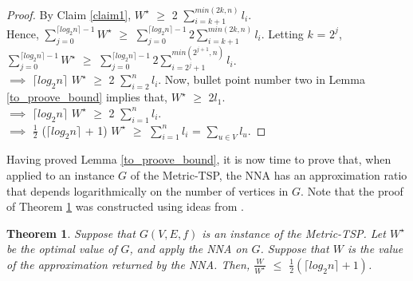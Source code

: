\documentclass[12pt]{article}
\newtheorem{theorem}[definition]{Theorem}
\numberwithin{equation}{subsection}
\numberwithin{table}{subsection}
\numberwithin{algorithm}{subsection}
\numberwithin{figure}{subsection}
\begin{document}
\begin{proof}
By Claim \ref{claim1},  $W^\star$  $\geq$ 2 $\sum_{i = k + 1}^{min(2k, n)} l_i$. \\Hence,  $\sum_{j = 0}^{\lceil log_2 n \rceil - 1} W^\star$  $\geq$ $\sum_{j = 0}^{\lceil log_2 n \rceil -1} 2 \sum_{i = k + 1}^{min(2k, n)} l_i$. Letting $k$ = $2^{j}$,\\$\sum_{j = 0}^{\lceil log_2 n \rceil - 1} W^\star$  $\geq$ $\sum_{j = 0}^{\lceil log_2 n \rceil -1} 2 \sum_{i = 2^j + 1}^{min(2^{j+1}, n)} l_i$. \\$\implies$ $\lceil log_2 n \rceil$ $W^\star$  $\geq$ 2 $\sum_{i = 2}^{n} l_i$. Now, bullet point number two in Lemma \ref{to_proove_bound} implies that, $W^\star$ $\geq$ 2$l_1$. \\$\implies$ $\lceil log_2 n \rceil$ $W^\star$  $\geq$ 2 $\sum_{i = 1}^{n} l_i$.\\$\implies$  $\frac{1}{2}$ ($\lceil log_2 n \rceil$ + 1) $W^\star$  $\geq$ $\sum_{i = 1}^{n} l_i$ = $\sum_{u \in V} l_u$.
\end{proof}
Having proved Lemma \ref{to_proove_bound}, it is now time to prove that, when applied to an instance $G$ of the Metric-TSP, the NNA has an approximation ratio that depends logarithmically on the number of vertices in $G$. Note that the proof of Theorem \ref{log_bound_thrm} was constructed using ideas from \cite{Rosenkrantz}.
\begin{theorem}
\label{log_bound_thrm}
Suppose that $G(V,E,f)$ is an instance of the Metric-TSP. Let $W^\star$ be the optimal value of $G$, and apply the NNA on $G$. Suppose that $W$ is the value of the approximation returned by the NNA. Then, $\frac{W}{W^\star}$ $\leq$ $\frac{1}{2}(\lceil log_2 n \rceil + 1)$. {\normalfont\cite{Rosenkrantz}}
\end{theorem}
\end{document}
